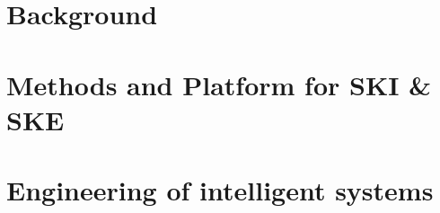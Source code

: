 \documentclass[12pt,a4paper,openright,twoside]{book}
\begin{document}
\mainmatter
\glsresetall




\part{Background}
\label{part:background}

\begin{refsection}

%

%
\printbibliography[title=References,heading=bibintoc]
\end{refsection}


\part{Methods and Platform for \gls{SKI} \& \gls{SKE}}
\label{part:engineering-of-ski-ske}

\begin{refsection}



\printbibliography[title=References,heading=bibintoc]
\end{refsection}


\part{Engineering of intelligent systems}\label{part:engineering-of-intelligent-systems}

\begin{refsection}



\printbibliography[title=References,heading=bibintoc]
\end{refsection}

\adjustmtc
\end{document}
